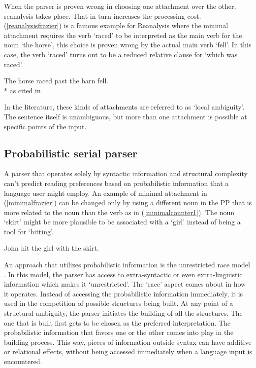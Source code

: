 When the parser is proven wrong in choosing one attachment over the other, reanalysis takes place. That in turn increases the processing cost. (\ref{reanalysisfrazier}) is a famous example for Reanalysis where the minimal attachment requires the verb `raced' to be interpreted as the main verb for the noun `the horse', this choice is proven wrong by the actual main verb `fell'. In this case, the verb `raced' turns out to be a reduced relative clause for `which was raced'.

\begin{exe}
\ex \label{reanalysisfrazier}
The horse raced past the barn fell. \\*
\hfill as cited in \citet{frazier1987sentence}
\end{exe}

In the literature, these kinds of attachments are referred to as `local ambiguity'. The sentence itself is unambiguous, but more than one attachment is possible at specific points of the input.

\subsection{Probabilistic serial parser}

A parser that operates solely by syntactic information and structural complexity can't predict reading preferences based on probabilistic information that a language user might employ. An example of minimal attachment in (\ref{minimalfrazier}) can be changed only by using a different noun in the PP that is more related to the noun than the verb as in (\ref{minimalcounter1}). The noun `skirt' might be more plausible to be associated with a `girl' instead of being a tool for `hitting'.

\begin{exe}
    \ex \label{minimalcounter1}
    John hit the girl with the skirt.
\end{exe}

An approach that utilizes probabilistic information is the unrestricted race model \citep{van2005evidence,van2001reanalysis,traxler1998adjunct}. In this model, the parser has access to extra-syntactic or even extra-linguistic \citep{willits2015language} information which makes it `unrestricted'. The `race' aspect comes about in how it operates. Instead of accessing the probabilistic information immediately, it is used in the competition of possible structures being built. At any point of a structural ambiguity, the parser initiates the building of all the structures. The one that is built first gets to be chosen as the preferred interpretation. The probabilistic information that favors one or the other comes into play in the building process. This way, pieces of information outside syntax can have additive or relational effects, without being accessed immediately when a language input is encountered. 



